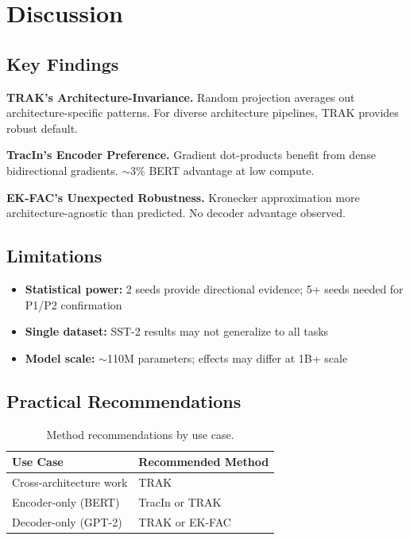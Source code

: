 \section{Discussion}

\subsection{Key Findings}

\textbf{TRAK's Architecture-Invariance.} Random projection averages out architecture-specific patterns. For diverse architecture pipelines, TRAK provides robust default.

\textbf{TracIn's Encoder Preference.} Gradient dot-products benefit from dense bidirectional gradients. $\sim$3\% BERT advantage at low compute.

\textbf{EK-FAC's Unexpected Robustness.} Kronecker approximation more architecture-agnostic than predicted. No decoder advantage observed.

\subsection{Limitations}

\begin{itemize}
    \item \textbf{Statistical power:} 2 seeds provide directional evidence; 5+ seeds needed for P1/P2 confirmation
    \item \textbf{Single dataset:} SST-2 results may not generalize to all tasks
    \item \textbf{Model scale:} $\sim$110M parameters; effects may differ at 1B+ scale
\end{itemize}

\subsection{Practical Recommendations}

\begin{table}[h]
\centering
\begin{tabular}{ll}
\toprule
Use Case & Recommended Method \\
\midrule
Cross-architecture work & TRAK \\
Encoder-only (BERT) & TracIn or TRAK \\
Decoder-only (GPT-2) & TRAK or EK-FAC \\
\bottomrule
\end{tabular}
\caption{Method recommendations by use case.}
\label{tab:recommendations}
\end{table}
